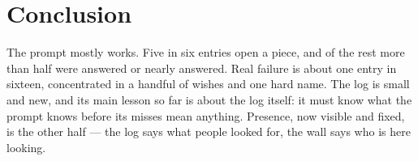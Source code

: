 \documentclass[10pt,letterpaper,twocolumn]{article}
\begin{document}
\section{Conclusion}
\label{sec:conclusion}

The prompt mostly works. Five in six entries open a piece, and of the rest
more than half were answered or nearly answered. Real failure is about one
entry in sixteen, concentrated in a handful of wishes and one hard name. The
log is small and new, and its main lesson so far is about the log itself: it
must know what the prompt knows before its misses mean anything. Presence,
now visible and fixed, is the other half --- the log says what people looked
for, the wall says who is here looking.

\balance


\end{document}
